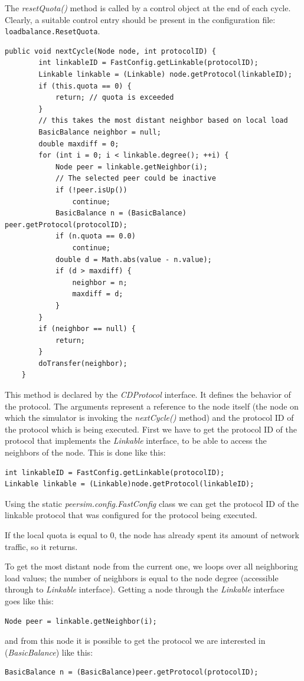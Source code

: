 \documentclass[a4paper,11pt]{article}
\begin{document}
The \emph{resetQuota()} method is called by a control object at
the end of each cycle. Clearly, a suitable control entry should be present
in the configuration file: \texttt{loadbalance.ResetQuota}.

\footnotesize
\begin{verbatim}
public void nextCycle(Node node, int protocolID) {
        int linkableID = FastConfig.getLinkable(protocolID);
        Linkable linkable = (Linkable) node.getProtocol(linkableID);
        if (this.quota == 0) {
            return; // quota is exceeded
        }
        // this takes the most distant neighbor based on local load
        BasicBalance neighbor = null;
        double maxdiff = 0;
        for (int i = 0; i < linkable.degree(); ++i) {
            Node peer = linkable.getNeighbor(i);
            // The selected peer could be inactive
            if (!peer.isUp())
                continue;
            BasicBalance n = (BasicBalance) peer.getProtocol(protocolID);
            if (n.quota == 0.0)
                continue;
            double d = Math.abs(value - n.value);
            if (d > maxdiff) {
                neighbor = n;
                maxdiff = d;
            }
        }
        if (neighbor == null) {
            return;
        }
        doTransfer(neighbor);
    }
\end{verbatim}
\normalsize

This method is declared by the \emph{CDProtocol} interface. It defines the
behavior of the protocol. The arguments represent a reference
to the node itself (the node on which the simulator is invoking the
\emph{nextCycle()} method) and the protocol ID of the protocol
which is being executed.
First we have to get the protocol ID of
the protocol that implements the \emph{Linkable} interface, to be able
to access the neighbors of the node.
This is done like this:
\begin{verbatim}
int linkableID = FastConfig.getLinkable(protocolID);
Linkable linkable = (Linkable)node.getProtocol(linkableID);
\end{verbatim}
Using the static \emph{peersim.config.FastConfig} class we can get the
protocol ID of the linkable protocol that was configured for the protocol
being executed.

If the local quota is equal to 0, the node has already
spent its amount of network traffic, so it returns.

To get the most distant node from the current one, we loops over
all neighboring load values; the number of neighbors is equal to the
node degree (accessible through to \emph{Linkable} interface). Getting a node
through the \emph{Linkable} interface goes like this:
\begin{verbatim}
Node peer = linkable.getNeighbor(i);
\end{verbatim}
and from this node it is possible
to get the protocol we are interested in (\emph{BasicBalance}) like this:
\begin{verbatim}
BasicBalance n = (BasicBalance)peer.getProtocol(protocolID);
\end{verbatim}
\end{document}
